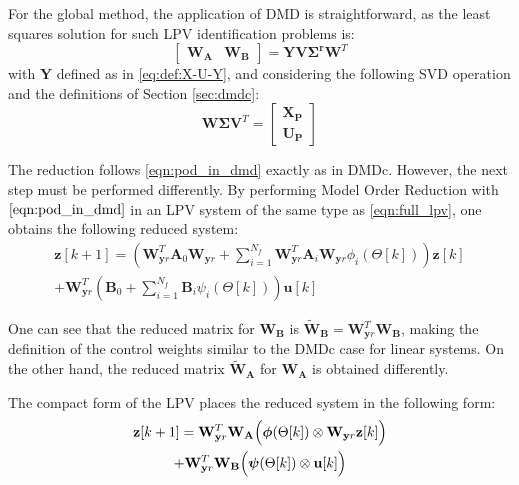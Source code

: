For the global method, the application of DMD is straightforward, as the least squares solution for such LPV identification problems is:
\begin{equation}
    \begin{bmatrix}
        \mathbf{W_A} & \mathbf{W_B} 
    \end{bmatrix} = \mathbf{Y}\mathbf{V}\mathbf{\Sigma^r}\mathbf{W}^T
\end{equation}
with $\mathbf{Y}$ defined as in \eqref{eq:def:X-U-Y}, and 
considering the following SVD operation and the definitions of Section \ref{sec:dmdc}:
\begin{equation}
    \mathbf{W}\mathbf{\Sigma}\mathbf{V}^T =
    \begin{bmatrix}
        \mathbf{X_P}\\
        \mathbf{U_P}
    \end{bmatrix}
\end{equation}

The reduction follows \eqref{eqn:pod_in_dmd} exactly as in DMDc.
%
However, the next step must be performed differently.
%
By performing Model Order Reduction with $\eqref{eqn:pod_in_dmd}$ in an LPV system of the same type as \eqref{eqn:full_lpv}, one obtains the following reduced system:
\begin{multline} \label{eqn:mor_lpv}
        \mathbf{z}[k+1] = \left(\mathbf{W}_{\mathbf{y}r}^T\mathbf{A}_0\mathbf{W}_{\mathbf{y}r} + \sum_{i=1}^{N_f}\mathbf{W}_{\mathbf{y}r}^T\mathbf{A}_i\mathbf{W}_{\mathbf{y}r}\phi_i(\Theta[k])\right)\mathbf{z}[k] \\ 
          + \mathbf{W}_{\mathbf{y}r}^T\left(\mathbf{B}_0 + \sum_{i=1}^{N_f}\mathbf{B}_i\psi_i(\Theta[k])\right)\mathbf{u}[k] 
\end{multline}

One can see that the reduced matrix for $\mathbf{W_{B}}$ is $\widetilde{\mathbf{W}}_{\mathbf{B}} = \mathbf{W}_{\mathbf{y}r}^T\mathbf{W_B}$, making the definition of the control weights similar to the DMDc case for linear systems. On the other hand, the reduced matrix $\widetilde{\mathbf{W}}_{\mathbf{A}}$ for $\mathbf{W_A}$  is obtained differently.

The compact form of the LPV places the reduced system in the following form:
\begin{multline}
\mathbf{z}[k+1] = \mathbf{W}_{\mathbf{y}r}^T\mathbf{W_A}\Bigl(\boldsymbol{\phi}(\Theta[k]) \otimes \mathbf{W}_{\mathbf{y}r}\mathbf{z}[k]\Bigr)   \\  
 + \mathbf{W}_{\mathbf{y}r}^T\mathbf{W_B}\Bigl(\boldsymbol{\psi}(\Theta[k]) \otimes \mathbf{u}[k]\Bigr)    
\end{multline}

